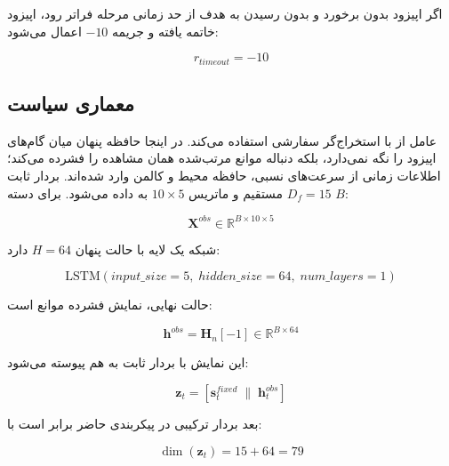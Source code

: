 اگر اپیزود بدون برخورد و بدون رسیدن به هدف از حد زمانی مرحله فراتر رود، اپیزود خاتمه یافته و جریمه \(-10\) اعمال می‌شود:

\begin{equation}
	r_{timeout}=-10
	\label{eq:timeout_penalty_final}
\end{equation}

\subsection{معماری سیاست }
\label{subsec:lstm_sac_architecture_final}

عامل از  با استخراج‌گر سفارشی  استفاده می‌کند.  در اینجا حافظه پنهان میان گام‌های اپیزود را نگه نمی‌دارد، بلکه دنباله موانع مرتب‌شده همان مشاهده را فشرده می‌کند؛ اطلاعات زمانی از سرعت‌های نسبی، حافظه محیط و کالمن وارد شده‌اند. بردار ثابت \(D_f=15\) مستقیم و ماتریس \(10\times5\) به  داده می‌شود. برای دسته \(B\):

\begin{equation}
	\mathbf{X}^{obs}\in\mathbb{R}^{B\times 10\times 5}
	\label{eq:lstm_input_shape_final}
\end{equation}

شبکه یک لایه با حالت پنهان \(H=64\) دارد:

\begin{equation}
	\mathrm{LSTM}(input\_size=5,\;hidden\_size=64,\;num\_layers=1)
	\label{eq:lstm_config_final}
\end{equation}

حالت نهایی، نمایش فشرده موانع است:

\begin{equation}
	\mathbf{h}^{obs}=\mathbf{H}_{n}[-1]\in\mathbb{R}^{B\times64}
	\label{eq:lstm_last_hidden_final}
\end{equation}

این نمایش با بردار ثابت به هم پیوسته می‌شود:

\begin{equation}
	\mathbf{z}_t=\left[\mathbf{s}^{fixed}_t\;\|\;\mathbf{h}^{obs}_t\right]
	\label{eq:feature_concat_final}
\end{equation}

بعد بردار ترکیبی در پیکربندی حاضر برابر است با:

\begin{equation}
	\dim(\mathbf{z}_t)=15+64=79
	\label{eq:combined_feature_dim_final}
\end{equation}

